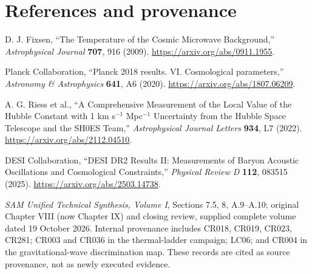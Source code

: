 \section*{References and provenance}
\begingroup\small
\begin{enumerate}[label={[VIII.\arabic*]},leftmargin=*]
\item D. J. Fixsen, ``The Temperature of the Cosmic Microwave Background,'' \emph{Astrophysical Journal} \textbf{707}, 916 (2009). \url{https://arxiv.org/abs/0911.1955}.
\item Planck Collaboration, ``Planck 2018 results. VI. Cosmological parameters,'' \emph{Astronomy \& Astrophysics} \textbf{641}, A6 (2020). \url{https://arxiv.org/abs/1807.06209}.
\item A. G. Riess et al., ``A Comprehensive Measurement of the Local Value of the Hubble Constant with 1 km s$^{-1}$ Mpc$^{-1}$ Uncertainty from the Hubble Space Telescope and the SH0ES Team,'' \emph{Astrophysical Journal Letters} \textbf{934}, L7 (2022). \url{https://arxiv.org/abs/2112.04510}.
\item DESI Collaboration, ``DESI DR2 Results II: Measurements of Baryon Acoustic Oscillations and Cosmological Constraints,'' \emph{Physical Review D} \textbf{112}, 083515 (2025). \url{https://arxiv.org/abs/2503.14738}.
\item \emph{SAM Unified Technical Synthesis, Volume I}, Sections 7.5, 8, A.9--A.10; original Chapter VIII (now Chapter IX) and closing review, supplied complete volume dated 19 October 2026. Internal provenance includes CR018, CR019, CR023, CR281; CR003 and CR036 in the thermal-ladder campaign; LC06; and CR004 in the gravitational-wave discrimination map. These records are cited as source provenance, not as newly executed evidence.
\end{enumerate}
\endgroup
